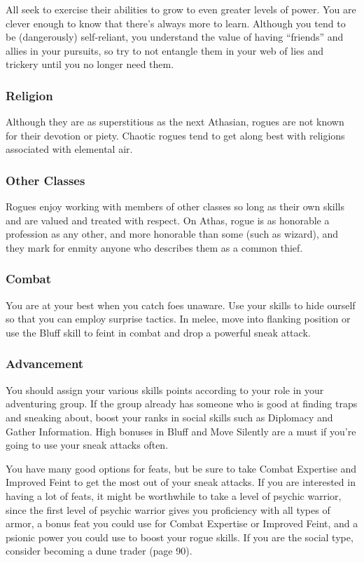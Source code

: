 All seek to exercise their abilities to grow to even greater levels of power. You are clever enough to know that there's always more to learn. Although you tend to be (dangerously) self‐reliant, you understand the value of having ``friends'' and allies in your pursuits, so try to not entangle them in your web of lies and trickery until you no longer need them.

\subsubsection{Religion}

Although they are as superstitious as the next Athasian, rogues are not known for their devotion or piety. Chaotic rogues tend to get along best with religions associated with elemental air.

\subsubsection{Other Classes}

Rogues enjoy working with members of other classes so long as their own skills and are valued and treated with respect. On Athas, rogue is as honorable a profession as any other, and more honorable than some (such as
wizard), and they mark for enmity anyone who describes them as a common thief.

\subsubsection{Combat}

You are at your best when you catch foes unaware. Use your skills to hide ourself so that you can employ surprise tactics. In melee, move into flanking position or use the Bluff skill to feint in combat and drop a powerful sneak attack.

\subsubsection{Advancement}

You should assign your various skills points according to your role in your adventuring group. If the group already has someone who is good at finding traps and sneaking about, boost your ranks in social skills such as Diplomacy and Gather Information. High bonuses in Bluff and Move Silently are a must if you're going to use your sneak attacks often.

You have many good options for feats, but be sure to take Combat Expertise and Improved Feint to get the most out of your sneak attacks. If you are interested in having a lot of feats, it might be worthwhile to take a level of psychic warrior, since the first level of psychic warrior gives you proficiency with all types of armor, a bonus feat you could use for Combat Expertise or Improved Feint, and a psionic power you could use to boost your rogue skills. If you are the social type, consider becoming a dune trader (page 90).


